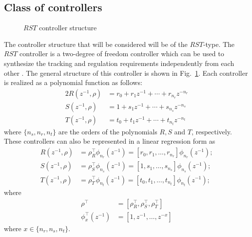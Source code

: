\documentclass[journal]{IEEEtran}
\begin{document}
\subsection{Class of controllers}
\begin{figure}
\centering
\resizebox{1\columnwidth}{!}{}
\caption{$RST$ controller structure}
\label{fig:rst}
\end{figure}
The controller structure that will be considered will be of the $RST$-type. The $RST$ controller is a two-degree of freedom controller which can be used to synthesize the tracking and regulation requirements independently from each other \cite{LZ06}. The general structure of this controller is shown in Fig.~\ref{fig:rst}. Each controller is realized as a polynomial function as follows:
\begin{alignat}{2}
R(z^{-1},\rho) &= r_0 + r_1z^{-1} + \cdots + r_{n_r}z^{-n_r} \label{eq:Rc}\\
S(z^{-1},\rho) &= 1 + s_1z^{-1} + \cdots + s_{n_s}z^{-n_s} \label{eq:Sc}\\
T(z^{-1},\rho) &= t_0 + t_1z^{-1} + \cdots + t_{n_t}z^{-n_t} \label{eq:Tc}
\end{alignat}
where $\{n_s,n_r,n_t\}$ are the orders of the polynomials $R,S$ and $T$, respectively. These controllers can also be represented in a linear regression form as 
\begin{align}
R(z^{-1},\rho)&=\rho_R^\top \phi_{n_r}(z^{-1})= [r_0,r_1,\ldots,r_{n_r}]\phi_{n_r}(z^{-1}); \nonumber \\
S(z^{-1},\rho)&=\rho_S^\top \phi_{n_s}(z^{-1})= [1,s_1,\ldots,s_{n_s}]\phi_{n_s}(z^{-1}); \nonumber \\
T(z^{-1},\rho)&=\rho_T^\top \phi_{n_t}(z^{-1})= [t_0,t_1,\ldots,t_{n_t}]\phi_{n_t}(z^{-1}); \nonumber
\end{align}
where
\begin{align}
\rho^\top &=[\rho_R^\top, \rho_S^\top, \rho_T^\top] \nonumber \\
\phi_x^\top(z^{-1}) &= [1,z^{-1},\ldots,z^{-x}] \nonumber
\end{align}
where $x \in \{n_r,n_s,n_t \}$.
 
\end{document}
